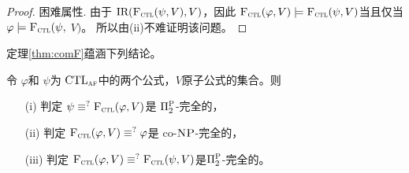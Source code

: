 \begin{proof}
困难属性. 由于 $\textrm{IR}({\textsc{F}_{\textsc{ctl}}}(\psi, V), V)$，因此 ${\textsc{F}_{\textsc{ctl}}}(\varphi, V) \models {\textsc{F}_{\textsc{ctl}}}(\psi, V)$当且仅当 $\varphi \models {\textsc{F}_{\textsc{ctl}}}(\psi,$ $V)$。 所以由(ii)不难证明该问题。
\end{proof}



定理\ref{thm:comF}蕴涵下列结论。
\begin{corollary}
	令 $\varphi$和 $\psi$为 $\textrm{CTL}_{\textsc{a} \textsc{f}}$中的两个公式，$V$原子公式的集合。则
	\begin{itemize}
		\item[(i)] 判定 $\psi \equiv^?{\textsc{F}_{\textsc{ctl}}}(\varphi, V)$是 $\Pi_2^{\textsc{P}}$-完全的，
		\item[(ii)] 判定 ${\textsc{F}_{\textsc{ctl}}}(\varphi, V) \equiv^? \varphi$是 co-$\textsc{NP}$-完全的，
		\item[(iii)] 判定 ${\textsc{F}_{\textsc{ctl}}}(\varphi, V) \equiv^? {\textsc{F}_{\textsc{ctl}}}(\psi, V)$是$\Pi_2^{\textsc{P}}$-完全的。
	\end{itemize}
\end{corollary}

